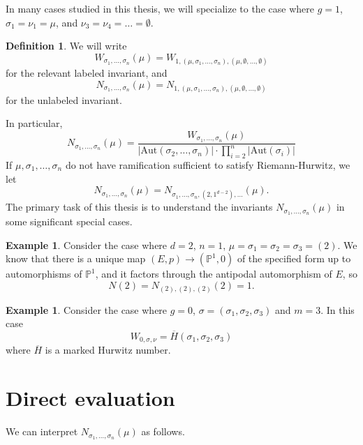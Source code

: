\documentclass[thesis]{thesis-umich}           %
\newcommand{\Aut}{\text{Aut}}
\renewcommand{\P}{\mathbb P}
\theoremstyle{definition}
\newtheorem{dfn}[thm]{Definition}
\newtheorem{eg}[thm]{Example}
\begin{document}
In many cases studied in this thesis, we will specialize to the case where $g=1$,
$\sigma_1=\nu_1=\mu$, and $\nu_3=\nu_4=\dots=\emptyset$.
\begin{dfn}
  We will write
\[
W_{\sigma_1,\dots,\sigma_n}(\mu)=W_{1,(\mu,\sigma_1,\dots,\sigma_n),(\mu,\emptyset,\dots,\emptyset)}
\]
for the relevant labeled invariant, and
\[
N_{\sigma_1,\dots,\sigma_n}(\mu)=N_{1,(\mu,\sigma_1,\dots,\sigma_n),(\mu,\emptyset,\dots,\emptyset)}
\]
for the unlabeled invariant.\end{dfn}
In particular,
\[
N_{\sigma_1,\dots,\sigma_n}(\mu)=\frac{W_{\sigma_1,\dots,\sigma_n}(\mu)}{|\Aut(\sigma_2,\dots,\sigma_n)|\cdot\prod_{i=2}^n|\Aut(\sigma_i)|}
\]
If $\mu,\sigma_1,\dots,\sigma_n$ do not have ramification sufficient to satisfy Riemann-Hurwitz,
we let \[N_{\sigma_1,\dots,\sigma_n}(\mu) = N_{\sigma_1,\dots,\sigma_n,(2,1^{d-2}),\dots}(\mu).\]
The primary task of this thesis is to understand the invariants $N_{\sigma_1,\dots,\sigma_n}(\mu)$
in some significant special cases.

\begin{eg}
  Consider the case where $d=2$, $n=1$, $\mu=\sigma_1=\sigma_2=\sigma_3=(2)$.
  We know that there is a unique map $(E,p)\to (\mathbb P^1,0)$ of the specified form
  up to automorphisms of $\P^1$, and it factors through the antipodal automorphism of $E$,
  so
  \[
  N(2)=N_{(2),(2),(2)}(2)=1.
  \]
\end{eg}

\begin{eg}
  Consider the case where $g=0$, $\sigma=(\sigma_1,\sigma_2,\sigma_3)$ and $m=3$. In this case
  \[
  W_{0,\sigma,\nu}=\overline H(\sigma_1,\sigma_2,\sigma_3)
  \]
  where $\overline H$ is a marked Hurwitz number.
  \end{eg}

\section{Direct evaluation}
\label{section:direct1}
We can interpret $N_{\sigma_1,\dots,\sigma_n}(\mu)$ as follows.
\end{document}
